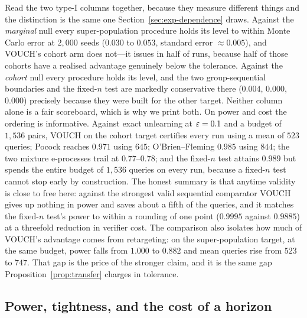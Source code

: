 Read the two type-I columns together, because they measure different things and the
distinction is the same one Section~\ref{sec:exp-dependence} draws. Against the
\emph{marginal} null every super-population procedure holds its level to within Monte
Carlo error at $2{,}000$ seeds ($0.030$ to $0.053$, standard error $\approx 0.005$),
and VOUCH's cohort arm does not---it issues in half of runs, because half of those
cohorts have a realised advantage genuinely below the tolerance. Against the
\emph{cohort} null every procedure holds its level, and the two group-sequential
boundaries and the fixed-$n$ test are markedly conservative there ($0.004$, $0.000$,
$0.000$) precisely because they were built for the other target. Neither column alone
is a fair scoreboard, which is why we print both. On power and cost the ordering is
informative. Against exact unlearning at $\varepsilon = 0.1$ and a budget of $1{,}536$ pairs,
VOUCH on the cohort target certifies every run using a mean of $523$ queries; Pocock
reaches $0.971$ using $645$; O'Brien--Fleming $0.985$ using $844$; the two mixture
e-processes trail at $0.77$--$0.78$; and the fixed-$n$ test attains $0.989$ but spends
the entire budget of $1{,}536$ queries on every run, because a fixed-$n$ test cannot
stop early by construction. The honest summary is that anytime validity is close to
free here: against the strongest valid sequential comparator VOUCH gives up nothing in
power and saves about a fifth of the queries, and it matches the fixed-$n$ test's power
to within a rounding of one point ($0.9995$ against $0.9885$) at a threefold reduction
in verifier cost. The comparison also
isolates how much of VOUCH's advantage comes from retargeting: on the
super-population target, at the same budget, power falls from $1.000$ to $0.882$ and
mean queries rise from $523$ to $747$. That gap is the price of the stronger claim, and
it is the same gap Proposition~\ref{prop:transfer} charges in tolerance.

\begin{table}[t]
\centering\small
\caption{Valid sequential comparators on the same sign stream and query budget
($2{,}000$ seeds, $\alpha = 0.05$). ``type I'' is measured at the least favourable
null; for the cohort target it is restricted to runs whose realised cohort advantage
violates the tolerance. ``power'' and ``queries'' are measured under exact unlearning.}
\label{tab:baselines}

\end{table}

\subsection{Power, tightness, and the cost of a horizon}\label{sec:exp-power}

